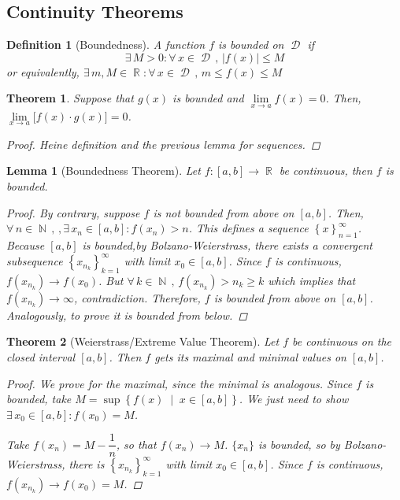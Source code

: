 \documentclass[12pt]{article}
\newcommand{\set}[2]{\left\{{#1}\;\middle|\;{#2}\right\}}
\newcommand{\Forall}[1]{\forall\,{#1}\,,\,}
\newcommand{\Exist}[1]{\exists\,{#1}:}
\newcommand{\seq}[2]{\left\{{#1}\right\}_{#2 =1}^\infty}
\DeclareMathOperator{\N}{\mathbb{N}}
\DeclareMathOperator{\R}{\mathbb{R}}
\DeclareMathOperator{\D}{\mathcal{D}}
\newtheorem{theorem}{Theorem}[subsection]
\newtheorem{definition}{Definition}[subsection]
\newtheorem{lemma}{Lemma}[subsection]
\begin{document}
\subsection{Continuity Theorems}

\begin{definition}[Boundedness]
  A function $f$ is bounded on $\D$ if
  $$\Exist{M>0}\Forall{x\in\D} |f(x)|\leq M$$
  or equivalently, $\Exist{m,M\in\R}\Forall{x\in\D} m\leq f(x)\leq M$
\end{definition}

\begin{theorem}
  Suppose that $g(x)$ is bounded and $\lim\limits_{x\to a}f(x)=0$. Then, $\lim\limits_{x\to a}\big[f(x)\cdot g(x)\big]=0$.
  \begin{proof}
    Heine definition and the previous lemma for sequences.
  \end{proof}
\end{theorem}

\begin{lemma}[Boundedness Theorem]
  Let $f:[a,b]\to\R$ be continuous, then $f$ is bounded.
  \begin{proof}
    By contrary, suppose $f$ is not bounded from above on $[a,b]$. Then, $\Forall{n\in\N},\Exist{x_n\in[a,b]}f(x_n)>n$. This defines a sequence $\seq{x}{n}$. Because $[a,b]$ is bounded,by Bolzano-Weierstrass, there exists a convergent subsequence $\seq{x_{n_k}}{k}$ with limit $x_0\in[a,b]$. Since $f$ is continuous, $f(x_{n_k})\to f(x_0)$. But $\Forall{k\in\N}f(x_{n_k})>n_{k}\geq k$ which implies that $f(x_{n_k})\to \infty$, contradiction. Therefore, $f$ is bounded from above on $[a,b]$. Analogously, to prove it is bounded from below.
  \end{proof}
\end{lemma}

\begin{theorem}[Weierstrass/Extreme Value Theorem]
  Let $f$ be continuous on the closed interval $[a,b]$. Then $f$ gets its maximal and minimal values on $[a,b]$.
  \begin{proof}
    We prove for the maximal, since the minimal is analogous. Since $f$ is bounded, take $M=\sup\set{f(x)}{x\in[a,b]}$. We just need to show $\Exist{x_0\in[a,b]}f(x_0)=M$. 
    
    Take $f(x_n)=M-\dfrac{1}{n}$, so that $f(x_n)\to M$. $\{x_n\}$ is bounded, so by Bolzano-Weierstrass, there is $\seq{x_{n_k}}{k}$ with limit $x_0\in[a,b]$. Since $f$ is continuous, $f(x_{n_k})\to f(x_0)=M$.
  \end{proof}
\end{theorem}
\end{document}
